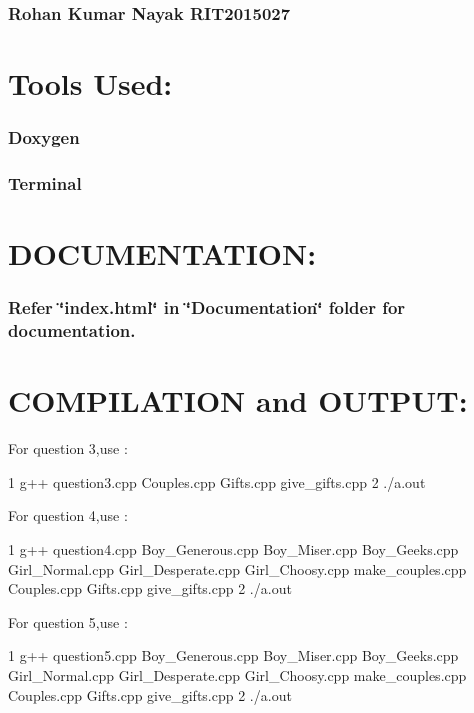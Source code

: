 \subsubsection*{Rohan Kumar Nayak R\+I\+T2015027}

\section*{Tools Used\+:}

\subsubsection*{Doxygen}

\subsubsection*{Terminal}

\section*{D\+O\+C\+U\+M\+E\+N\+T\+A\+T\+I\+ON\+:}

\subsubsection*{Refer \char`\"{}index.\+html\char`\"{} in \char`\"{}\+Documentation\char`\"{} folder for documentation.}

\section*{C\+O\+M\+P\+I\+L\+A\+T\+I\+ON and O\+U\+T\+P\+UT\+:}

For question 3,use \+:


\begin{DoxyCode}
1 g++ question3.cpp Couples.cpp Gifts.cpp give\_gifts.cpp 
2 ./a.out
\end{DoxyCode}


For question 4,use \+:


\begin{DoxyCode}
1 g++ question4.cpp Boy\_Generous.cpp Boy\_Miser.cpp Boy\_Geeks.cpp Girl\_Normal.cpp Girl\_Desperate.cpp
       Girl\_Choosy.cpp make\_couples.cpp Couples.cpp Gifts.cpp give\_gifts.cpp
2 ./a.out
\end{DoxyCode}


For question 5,use \+: 
\begin{DoxyCode}
1 g++ question5.cpp Boy\_Generous.cpp Boy\_Miser.cpp Boy\_Geeks.cpp Girl\_Normal.cpp Girl\_Desperate.cpp
       Girl\_Choosy.cpp make\_couples.cpp Couples.cpp Gifts.cpp give\_gifts.cpp
2 ./a.out
\end{DoxyCode}
